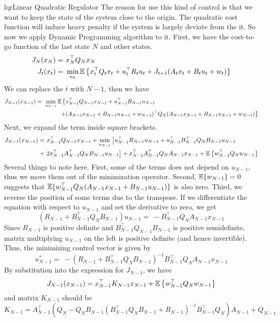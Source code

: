 \documentclass[9pt]{article}
\begin{document}
\begin{topic}{lqr}{Linear Quadratic Regulator}
The reason for use this kind of control is that we want to keep the state of the system close to the origin. The quadratic cost function will induce heavy penalty if the system is largely deviate from the it. 
So now we apply Dynamic Programming algorithm to it. First, we have the cost-to-go function of the last state $N$ and other states.
\[
\begin{split}
J_N(x_N) = &\ x_N^{\top}Q_Nx_N\\
J_t(x_t) = &\ \min_{u_k} \operatorname{\mathbb{E}} \big\{ x_t^{\top}Q_tx_t + u_t^{\top}R_tu_t + J_{t+1}(A_tx_t + B_tu_t+w_t)\big\}
\end{split}
\]
We can replace the $t$ with $N-1$, then we have 
\[
\begin{split}
J_{N-1}(x_{N-1}) =\ \min_{u_{N-1}} \operatorname{\mathbb{E}} \big\{ & x_{N-1}^{\top}Q_{N-1}x_{N-1} + u_{N-1}^{\top}R_{N-1}u_{N-1}\\
 + &(A_{N-1}x_{N-1} + B_{N-1}u_{N-1}+w_{N-1})^{\top}Q_N(A_{N-1}x_{N-1} + B_{N-1}u_{N-1}+w_{N-1})\big\}
\end{split}
\]
Next, we expand the term inside square brackets.
\[
\begin{split}
J_{N-1}(x_{N-1}) = &\  x_{N-1}^{\top}Q_{N-1}x_{N-1} + \min_{u_{N-1}} \big[ u_{N-1}^{\top}R_{N-1}u_{N-1} + u_{N-1}^{\top}B_{N-1}^{\top}Q_NB_{N-1}u_{N-1}\\
 +&\ 2x_{N-1}^{\top}A_{N-1}^{\top}Q_NB_{N-1}u_{N-1}\big] + x_{N-1}^{\top}A_{N-1}^{\top}Q_NA_{N-1}x_{N-1} + \operatorname{\mathbb{E}}\big\{ w_{N-1}^{\top}Q_Nw_{N-1}\big\}
\end{split}
\]
Several things to note here. First, some of the terms does not depend on $u_{N-1}$, thus we move them out of the minimization operator. Second, $\operatorname{\mathbb{E}}\{w_{N-1}\} = 0$ suggests that $\operatorname{\mathbb{E}}\{w_{N-1}^{\top}Q_N(A_{N-1}x_{N-1} + B_{N-1}u_{N-1})\}$ is also zero.
Third, we reverse the position of some terms due to the transpose. If we differentiate the equation with respect to $u_{N-1}$ and set the derivative to zero, we get 
\[
(R_{N-1}+B_{N-1}^{\top}Q_NB_{N-1})u_{N-1} =\ -B_{N-1}^{\top}Q_NA_{N-1}x_{N-1}
\]
Since $R_{N-1}$ is positive definite and $B_{N-1}^{\top}Q_{N-1}B_{N-1}$ is positive semidefinite, matrix multiplying $u_{N-1}$ on the left is positive definite (and hence invertible). Thus, the minimizing control vector is given by
\[
u_{N-1}^{*} =\ -(R_{N-1}+B_{N-1}^{\top}Q_NB_{N-1})^{-1}B_{N-1}^{\top}Q_NA_{N-1}x_{N-1}
\] 
By substitution into the expression for $J_{N-1}$, we have 
\[
J_{N-1}(x_{N-1}) = x_{N-1}^{\top}K_{N-1}x_{N-1} + \operatorname{\mathbb{E}}\big\{w_{N-1}^{\top}Q_Nw_{N-1}\big\}
\]
and matrix $K_{N-1}$ should be
\[
K_{N-1} = A_{N-1}^{\top}(Q_N-Q_NB_{N-1}(B_{N-1}^{\top}Q_NB_{N-1}+R_{N-1})^{-1}B_{N-1}^{\top}Q_N)A_{N-1}+Q_{N-1}
\]
\end{topic}
\end{document}

